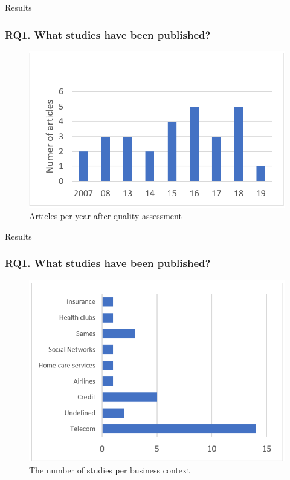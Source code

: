\documentclass[10pt]{beamer}
\begin{document}
\begin{frame}[fragile]{Results}
	\frametitle{RQ1. What studies have been published?}
	\begin{figure}
		\includegraphics[scale=0.5]{../img/articles_by_Year.png}
		\caption{Articles per year after quality assessment}
		\label{figure2}
	\end{figure}
\end{frame}

\begin{frame}[fragile]{Results}
	\frametitle{RQ1. What studies have been published?}
	\begin{figure}
		\includegraphics[scale=0.5]{../img/studiesByBusiness.png}
		\caption{The number of studies per business context}
		\label{figure3}
	\end{figure}
\end{frame}
\end{document}
